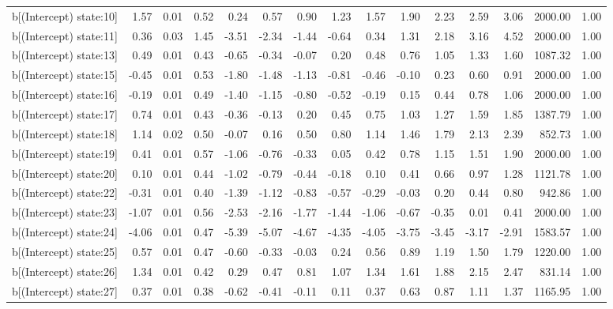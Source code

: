 \begin{table}[ht]
\begin{tabular}{rrrrrrrrrrrrrrr}
  b[(Intercept) state:10] & 1.57 & 0.01 & 0.52 & 0.24 & 0.57 & 0.90 & 1.23 & 1.57 & 1.90 & 2.23 & 2.59 & 3.06 & 2000.00 & 1.00 \\ 
  b[(Intercept) state:11] & 0.36 & 0.03 & 1.45 & -3.51 & -2.34 & -1.44 & -0.64 & 0.34 & 1.31 & 2.18 & 3.16 & 4.52 & 2000.00 & 1.00 \\ 
  b[(Intercept) state:13] & 0.49 & 0.01 & 0.43 & -0.65 & -0.34 & -0.07 & 0.20 & 0.48 & 0.76 & 1.05 & 1.33 & 1.60 & 1087.32 & 1.00 \\ 
  b[(Intercept) state:15] & -0.45 & 0.01 & 0.53 & -1.80 & -1.48 & -1.13 & -0.81 & -0.46 & -0.10 & 0.23 & 0.60 & 0.91 & 2000.00 & 1.00 \\ 
  b[(Intercept) state:16] & -0.19 & 0.01 & 0.49 & -1.40 & -1.15 & -0.80 & -0.52 & -0.19 & 0.15 & 0.44 & 0.78 & 1.06 & 2000.00 & 1.00 \\ 
  b[(Intercept) state:17] & 0.74 & 0.01 & 0.43 & -0.36 & -0.13 & 0.20 & 0.45 & 0.75 & 1.03 & 1.27 & 1.59 & 1.85 & 1387.79 & 1.00 \\ 
  b[(Intercept) state:18] & 1.14 & 0.02 & 0.50 & -0.07 & 0.16 & 0.50 & 0.80 & 1.14 & 1.46 & 1.79 & 2.13 & 2.39 & 852.73 & 1.00 \\ 
  b[(Intercept) state:19] & 0.41 & 0.01 & 0.57 & -1.06 & -0.76 & -0.33 & 0.05 & 0.42 & 0.78 & 1.15 & 1.51 & 1.90 & 2000.00 & 1.00 \\ 
  b[(Intercept) state:20] & 0.10 & 0.01 & 0.44 & -1.02 & -0.79 & -0.44 & -0.18 & 0.10 & 0.41 & 0.66 & 0.97 & 1.28 & 1121.78 & 1.00 \\ 
  b[(Intercept) state:22] & -0.31 & 0.01 & 0.40 & -1.39 & -1.12 & -0.83 & -0.57 & -0.29 & -0.03 & 0.20 & 0.44 & 0.80 & 942.86 & 1.00 \\ 
  b[(Intercept) state:23] & -1.07 & 0.01 & 0.56 & -2.53 & -2.16 & -1.77 & -1.44 & -1.06 & -0.67 & -0.35 & 0.01 & 0.41 & 2000.00 & 1.00 \\ 
  b[(Intercept) state:24] & -4.06 & 0.01 & 0.47 & -5.39 & -5.07 & -4.67 & -4.35 & -4.05 & -3.75 & -3.45 & -3.17 & -2.91 & 1583.57 & 1.00 \\ 
  b[(Intercept) state:25] & 0.57 & 0.01 & 0.47 & -0.60 & -0.33 & -0.03 & 0.24 & 0.56 & 0.89 & 1.19 & 1.50 & 1.79 & 1220.00 & 1.00 \\ 
  b[(Intercept) state:26] & 1.34 & 0.01 & 0.42 & 0.29 & 0.47 & 0.81 & 1.07 & 1.34 & 1.61 & 1.88 & 2.15 & 2.47 & 831.14 & 1.00 \\ 
  b[(Intercept) state:27] & 0.37 & 0.01 & 0.38 & -0.62 & -0.41 & -0.11 & 0.11 & 0.37 & 0.63 & 0.87 & 1.11 & 1.37 & 1165.95 & 1.00 \\ 

\end{tabular}
\end{table}
